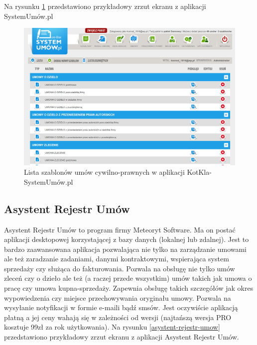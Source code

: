Na rysunku \ref{kotkla-systemumow} przedstawiono przykładowy zrzut ekranu z aplikacji SystemUmów.pl

\begin{figure}[tdh]
    \begin{center}
	\includegraphics[scale=.4]{img/kotkla-systemumow.png}
	\caption{Lista szablonów umów cywilno-prawnych w aplikacji KotKla-SystemUmów.pl}
	\label{kotkla-systemumow}
    \end{center}
\end{figure}

\subsection[Asystent Rejestr Umów][Asystent Rejestr Umów]{Asystent Rejestr Umów}
Asystent Rejestr Umów to program firmy Meteoryt Software. Ma on postać aplikacji desktopowej korzystającej z bazy danych (lokalnej lub zdalnej). Jest to bardzo zaawansowana aplikacja pozwalająca nie tylko na zarządzanie umowami ale też zaradzanie zadaniami, danymi kontraktowymi, wspierająca system sprzedaży czy służąca do fakturowania. Pozwala na obsługę nie tylko umów zleceń czy o dzieło ale też (a raczej przede wszystkim) umów takich jak umowa o pracę czy umowa kupna-sprzedaży. Zapewnia obsługę takich szczegółów jak okres wypowiedzenia czy miejsce przechowywania oryginału umowy. Pozwala na wysyłanie notyfikacji w formie e-maili bądź smsów. Jest oczywiście aplikacją płatną a jej ceny wahają się w zależności od wersji (najtańszą wersja PRO kosztuje 99zł za rok użytkowania). Na rysunku \ref{asystent-rejestr-umow} przedstawiono przykładowy zrzut ekranu z aplikacji Asystent Rejestr Umów.

